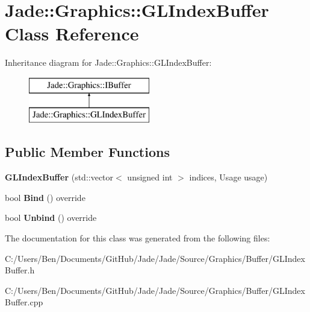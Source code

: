 \hypertarget{class_jade_1_1_graphics_1_1_g_l_index_buffer}{}\section{Jade\+:\+:Graphics\+:\+:G\+L\+Index\+Buffer Class Reference}
\label{class_jade_1_1_graphics_1_1_g_l_index_buffer}
Inheritance diagram for Jade\+:\+:Graphics\+:\+:G\+L\+Index\+Buffer\+:\begin{figure}[H]
\begin{center}
\leavevmode
\includegraphics[height=2.000000cm]{class_jade_1_1_graphics_1_1_g_l_index_buffer}
\end{center}
\end{figure}
\subsection*{Public Member Functions}
\begin{DoxyCompactItemize}
\item 
\hypertarget{class_jade_1_1_graphics_1_1_g_l_index_buffer_a3e8a319cdbe847920db4c139de7b7cf4}{}{\bfseries G\+L\+Index\+Buffer} (std\+::vector$<$ unsigned int $>$ indices, Usage usage)\label{class_jade_1_1_graphics_1_1_g_l_index_buffer_a3e8a319cdbe847920db4c139de7b7cf4}

\item 
\hypertarget{class_jade_1_1_graphics_1_1_g_l_index_buffer_ae0408893f184bf928e981c82e2abdebf}{}bool {\bfseries Bind} () override\label{class_jade_1_1_graphics_1_1_g_l_index_buffer_ae0408893f184bf928e981c82e2abdebf}

\item 
\hypertarget{class_jade_1_1_graphics_1_1_g_l_index_buffer_ac41109d5752e2b18de21ef8827c04bc2}{}bool {\bfseries Unbind} () override\label{class_jade_1_1_graphics_1_1_g_l_index_buffer_ac41109d5752e2b18de21ef8827c04bc2}

\end{DoxyCompactItemize}


The documentation for this class was generated from the following files\+:\begin{DoxyCompactItemize}
\item 
C\+:/\+Users/\+Ben/\+Documents/\+Git\+Hub/\+Jade/\+Jade/\+Source/\+Graphics/\+Buffer/G\+L\+Index\+Buffer.\+h\item 
C\+:/\+Users/\+Ben/\+Documents/\+Git\+Hub/\+Jade/\+Jade/\+Source/\+Graphics/\+Buffer/G\+L\+Index\+Buffer.\+cpp\end{DoxyCompactItemize}
